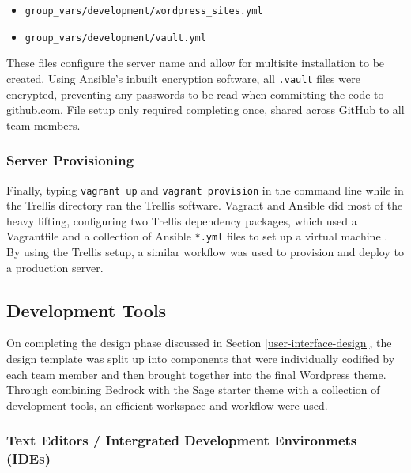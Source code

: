 \documentclass[fontsize=11pt]{extarticle}
\numberwithin{figure}{section} %
\numberwithin{table}{section}%
\providecommand{\tightlist}{%
  \setlength{\itemsep}{0pt}\setlength{\parskip}{0pt}}
\begin{document}
\begin{itemize}
\tightlist
\item
  \texttt{group\_vars/development/wordpress\_sites.yml}
\item
  \texttt{group\_vars/development/vault.yml}
\end{itemize}

These files configure the server name and allow for multisite
installation to be created. Using Ansible's inbuilt encryption software,
all \texttt{.vault} files were encrypted, preventing any passwords to be
read when committing the code to github.com. File setup only required
completing once, shared across GitHub to all team members.

\hypertarget{server-provisioning}{%
\subsubsection{Server Provisioning}\label{server-provisioning}}

Finally, typing \texttt{vagrant\ up} and \texttt{vagrant\ provision} in
the command line while in the Trellis directory ran the Trellis
software. Vagrant and Ansible did most of the heavy lifting, configuring
two Trellis dependency packages, which used a Vagrantfile and a
collection of Ansible \texttt{*.yml} files to set up a virtual machine
\cite{p22}. By using the Trellis setup, a similar workflow was used to
provision and deploy to a production server.

\hypertarget{development-tools}{%
\subsection{Development Tools}\label{development-tools}}

On completing the design phase discussed in Section
\ref{user-interface-design}, the design template was split up into
components that were individually codified by each team member and then
brought together into the final Wordpress theme. Through combining
Bedrock with the Sage starter theme with a collection of development
tools, an efficient workspace and workflow were used.

\hypertarget{text-editors-intergrated-development-environmets-ides}{%
\subsubsection{Text Editors / Intergrated Development Environmets
(IDEs)}\label{text-editors-intergrated-development-environmets-ides}}
\end{document}
